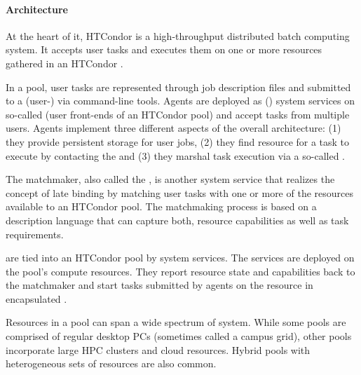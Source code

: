 \documentclass{sig-alternate}
\begin{document}



\paragraph{Architecture}

At the heart of it, HTCondor is a high-throughput distributed batch computing
system.
It accepts user tasks and executes them on one or more resources gathered in an
HTCondor .

In a pool, user tasks are represented through job description files and
submitted to a (user-) via command-line tools.
Agents are deployed as () system services on so-called
 (user front-ends of an HTCondor pool) and accept
tasks from multiple users.
Agents implement three different aspects of the overall architecture:
(1) they provide persistent storage for user jobs, (2) they find resource for
a task to execute by contacting the  and (3) they marshal
task execution via a so-called .

The matchmaker, also called the , is another system
service that realizes the concept of late binding by matching user tasks with
one or more of the resources available to an HTCondor pool. The matchmaking
process is based on  a description language that can capture
both, resource capabilities as well as task requirements.

 are tied into an HTCondor pool by  system
services.
The  services are deployed on the pool's compute resources.
They report resource state and  capabilities back to the matchmaker and start
tasks submitted by agents on the resource in encapsulated .

Resources in a pool can span a wide spectrum of system.
While some pools are comprised of regular desktop PCs (sometimes called a
campus grid), other pools incorporate large HPC clusters and cloud resources.
Hybrid pools with heterogeneous sets of resources are also common.
\end{document}
